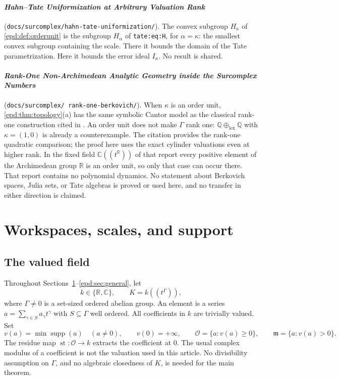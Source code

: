 \documentclass[11pt,a4paper]{article}
\numberwithin{equation}{section}
\theoremstyle{plain}
\theoremstyle{definition}
\theoremstyle{remark}
\newcommand{\R}{\mathbb R}
\newcommand{\C}{\mathbb C}
\newcommand{\Q}{\mathbb Q}
\newcommand{\OO}{\mathcal O}
\newcommand{\mm}{\mathfrak m}
\newcommand{\Ik}{I_\kappa}
\newcommand{\supp}{\operatorname{supp}}
\newcommand{\st}{\operatorname{st}}
\begin{document}
\paragraph{\emph{Hahn--Tate Uniformization at Arbitrary Valuation Rank}}
(\texttt{docs/\allowbreak surcomplex/\allowbreak hahn-tate-\allowbreak uniformization/}).
The convex subgroup $H_\kappa$ of \cref{epd:def:orderunit} is the
subgroup $H_\alpha$ of \texttt{tate:eq:H}, for $\alpha=\kappa$: the smallest
convex subgroup containing the scale. There it bounds the domain of
the Tate parametrization. Here it bounds the error ideal $\Ik$. No
result is shared.

\paragraph{\emph{Rank-One Non-Archimedean Analytic Geometry inside the
Surcomplex Numbers}} (\texttt{docs/\allowbreak surcomplex/\allowbreak
rank-one-\allowbreak berkovich/}). When $\kappa$ is an order unit,
\cref{epd:thm:topology}(a) has the same symbolic Cantor model as the
classical rank-one construction cited in
\cite[Example~4.39]{Benedetto}. An order unit does not make $\Gamma$
rank one: $\Q\oplus_{\mathrm{lex}}\Q$ with $\kappa=(1,0)$ is already
a counterexample. The citation provides the rank-one quadratic comparison;
the proof here uses the exact cylinder valuations even at higher rank.
In the fixed field $\C((t^{\R}))$ of that report every positive element of
the Archimedean group $\R$ is an order unit, so only that case can occur
there. That report contains no polynomial dynamics. No statement about
Berkovich spaces, Julia sets, or Tate algebras is proved or used here, and
no transfer in either direction is claimed.

\section{Workspaces, scales, and support}
\label{epd:sec:workspace}
\subsection{The valued field}
Throughout Sections~\ref{epd:sec:workspace}--\ref{epd:sec:general}, let
\[
 k\in\{\R,\C\},\qquad K=k((t^\Gamma)),
\]
where $\Gamma\ne0$ is a set-sized ordered abelian group. An element is a
series $a=\sum_{\gamma\in S}a_\gamma t^\gamma$ with $S\subseteq\Gamma$
well ordered. All coefficients in $k$ are trivially valued. Set
\[
 v(a)=\min\supp(a)\quad(a\ne0),\qquad v(0)=+\infty,
 \qquad \OO=\{a:v(a)\geq0\},\qquad \mm=\{a:v(a)>0\}.
\]
The residue map $\st:\OO\to k$ extracts the coefficient at $0$.
The usual complex modulus of a coefficient is not the valuation used
in this article. No divisibility assumption on $\Gamma$, and no
algebraic closedness of $K$, is needed for the main theorem.
\end{document}
